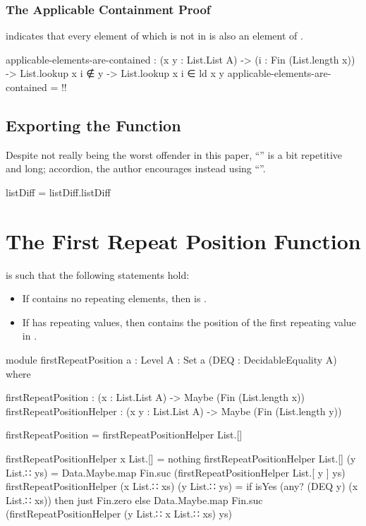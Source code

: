 \documentclass{report}
\begin{document}
\subsubsection{The Applicable Containment Proof}
 indicates that every element of  which is not in  is also an element of   .

\begin{code}
    applicable-elements-are-contained :
      (x y : List.List A) ->
      (i : Fin (List.length x)) ->
      List.lookup x i ∉ y ->
      List.lookup x i ∈ ld x y
    applicable-elements-are-contained = {!!}
\end{code}

\subsection{Exporting the Function}
Despite not really being the worst offender in this paper, ``'' is a bit repetitive and long; accordion, the author encourages instead using ``''.

\begin{code}
listDiff = listDiff.listDiff
\end{code}

\section{The First Repeat Position Function}
 is such that the following statements hold:

\begin{itemize}
  \item If  contains no repeating elements, then    is .
  \item If  has repeating values, then    contains the position of the first repeating value in .
\end{itemize}

\begin{code}
module firstRepeatPosition
  {a : Level}
  {A : Set a}
  (DEQ : DecidableEquality A) where

  firstRepeatPosition : (x : List.List A) -> Maybe (Fin (List.length x))
  firstRepeatPositionHelper : (x y : List.List A) -> Maybe (Fin (List.length y))

  firstRepeatPosition = firstRepeatPositionHelper List.[]

  firstRepeatPositionHelper x List.[] = nothing
  firstRepeatPositionHelper List.[] (y List.∷ ys) =
    Data.Maybe.map Fin.suc (firstRepeatPositionHelper List.[ y ] ys)
  firstRepeatPositionHelper (x List.∷ xs) (y List.∷ ys) =
    if isYes (any? (DEQ y) (x List.∷ xs))
      then just Fin.zero
      else Data.Maybe.map Fin.suc (firstRepeatPositionHelper (y List.∷ x List.∷ xs) ys)
\end{code}
\end{document}
